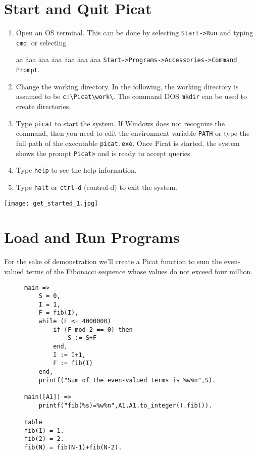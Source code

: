 \documentclass{article}[12pt]
\begin{document}
\section*{\Large{Start and Quit Picat}}
\begin{enumerate}
\item Open an OS terminal. This can be done by selecting \verb+Start->Run+ and typing \verb+cmd+, or selecting 
\begin{tabbing}
aa \= aaa \= aaa \= aaa \= aaa \= aaa \= aaa \kill
\> \> \verb+Start->Programs->Accessories->Command Prompt+.  
\end{tabbing}

\item Change the working directory. In the following, the working directory is assumed to be \verb+c:\Picat\work\+. The command DOS \texttt{mkdir} can be used to create directories.

\item Type \verb+picat+ to start the system. If Windows does not recognize the command, then you need to edit the environment variable \texttt{PATH} or type the full path of the executable \verb+picat.exe+. Once Picat is started, the system shows the prompt \verb+Picat>+ and is ready to accept queries.

\item Type \texttt{help} to see the help information.

\item Type \texttt{halt} or \verb+ctrl-d+ (control-d) to exit the system.
\end{enumerate}

\texttt{[image: get\_started\_1.jpg]}

\section*{\Large{Load and Run Programs}} 
\indent For the sake of demonstration we'll create a Picat function to sum the
even-valued terms of the Fibonacci sequence whose values do not exceed four million.

\begin{figure}[htb]
\begin{verbatim} 
main =>
    S = 0,
    I = 1,
    F = fib(I),
    while (F <= 4000000)
        if (F mod 2 == 0) then
            S := S+F
        end,
        I := I+1,
        F := fib(I)
    end,
    printf("Sum of the even-valued terms is %w%n",S).
       
main([A1]) => 
    printf("fib(%s)=%w%n",A1,A1.to_integer().fib()).

table
fib(1) = 1.
fib(2) = 2.
fib(N) = fib(N-1)+fib(N-2).
\end{verbatim}
\end{figure}
\vspace*{-5mm}
\end{document}
